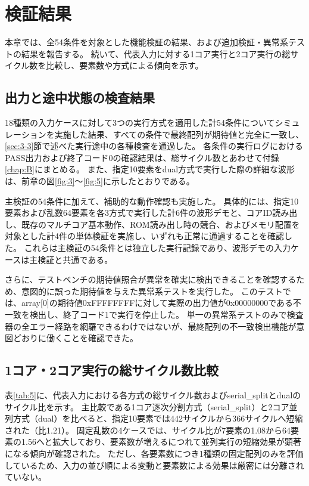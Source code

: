 \chapter{検証結果}\label{chap:5}

本章では、全54条件を対象とした機能検証の結果、および追加検証・異常系テストの結果を報告する。
続いて、代表入力に対する1コア実行と2コア実行の総サイクル数を比較し、要素数や方式による傾向を示す。

\section{出力と途中状態の検査結果}\label{sec:5-1}

18種類の入力ケースに対して3つの実行方式を適用した計54条件についてシミュレーションを実施した結果、すべての条件で最終配列が期待値と完全に一致し、\ref{sec:3-3}節で述べた実行途中の各種検査を通過した。
各条件の実行ログにおけるPASS出力および終了コード0の確認結果は、総サイクル数とあわせて付録\ref{chap:B}にまとめる。
また、指定10要素をdual方式で実行した際の詳細な波形は、前章の図\ref{fig:3}〜\ref{fig:5}に示したとおりである。

主検証の54条件に加えて、補助的な動作確認も実施した。
具体的には、指定10要素および乱数64要素を各3方式で実行した計6件の波形デモと、コアID読み出し、既存のマルチコア基本動作、ROM読み出し時の競合、およびメモリ配置を対象とした計4件の単体検証を実施し、いずれも正常に通過することを確認した。
これらは主検証の54条件とは独立した実行記録であり、波形デモの入力ケースは主検証と共通である。

さらに、テストベンチの期待値照合が異常を確実に検出できることを確認するため、意図的に誤った期待値を与えた異常系テストを実行した。
このテストでは、array[0]の期待値0xFFFFFFFFに対して実際の出力値が0x00000000である不一致を検出し、終了コード1で実行を停止した。
単一の異常系テストのみで検査器の全エラー経路を網羅できるわけではないが、最終配列の不一致検出機能が意図どおりに働くことを確認できた。

\section{1コア・2コア実行の総サイクル数比較}\label{sec:5-2}

表\ref{tab:5}に、代表入力における各方式の総サイクル数およびserial\_splitとdualのサイクル比を示す。
主比較である1コア逐次分割方式（serial\_split）と2コア並列方式（dual）を比べると、指定10要素では442サイクルから366サイクルへ短縮された（比1.21）。
固定乱数の4ケースでは、サイクル比が7要素の1.08から64要素の1.56へと拡大しており、要素数が増えるにつれて並列実行の短縮効果が顕著になる傾向が確認された。
ただし、各要素数につき1種類の固定配列のみを評価しているため、入力の並び順による変動と要素数による効果は厳密には分離されていない。

